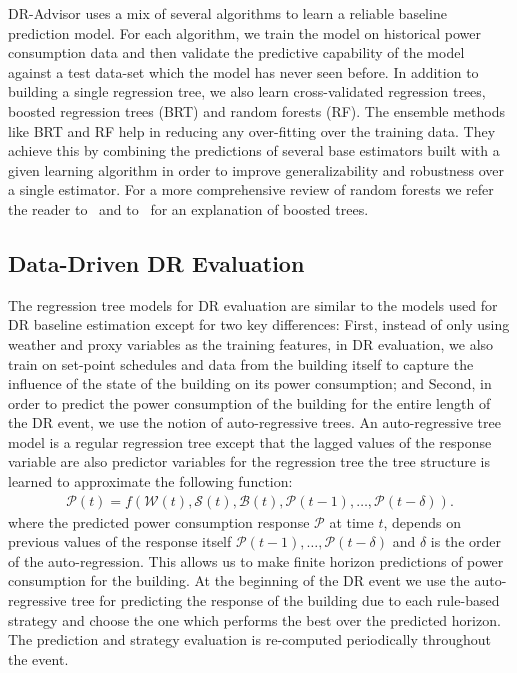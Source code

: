 DR-Advisor uses a mix of several algorithms to learn a reliable baseline prediction model. For each algorithm, we train the model on historical power consumption data and then validate the predictive capability of the model against a test data-set which the model has never seen before.
In addition to building a single regression tree, we also learn cross-validated regression trees, boosted regression trees (BRT) and random forests (RF). The ensemble methods like BRT and RF help in reducing any over-fitting over the training data. They achieve this by combining the predictions of several base estimators built with a given learning algorithm in order to improve generalizability and robustness over a single estimator.
For a more comprehensive review of random forests we refer the reader to~\cite{breiman2001random} and to~\cite{elith2008working} for an explanation of boosted trees.

\subsection{Data-Driven DR Evaluation}
\label{sec:autort}

The regression tree models for DR evaluation are similar to the models used for DR baseline estimation except for two key differences:
First, instead of only using weather and proxy variables as the training features, in DR evaluation, we also train on set-point schedules and data from the building itself to capture the influence of the state of the building on its power consumption; and 
Second, in order to predict the power consumption of the building for the entire length of the DR event, we use the notion of auto-regressive trees. An auto-regressive tree model is a regular regression tree except that the lagged values of the response variable are also predictor variables for the regression tree \ie the tree structure is learned to approximate the following function:
\begin{gather}
  \mathcal{P}(t) = \mathit{f} \left( \mathcal{W}(t), \mathcal{S}(t), \mathcal{B}(t), \mathcal{P}(t-1),\dots, \mathcal{P}(t-\delta) \right).
\label{E:building_model}
\end{gather}
where the predicted power consumption response $\mathcal{P}$ at time $t$, depends on previous values of the response itself $ \mathcal{P}(t-1),\dots, \mathcal{P}(t-\delta)$ and $\delta$ is the order of the auto-regression.
This allows us to make finite horizon predictions of power consumption for the building.
At the beginning of the DR event we use the auto-regressive tree for predicting the response of the building due to each rule-based strategy and choose the one which performs the best over the predicted horizon. The prediction and strategy evaluation is re-computed periodically throughout the event.